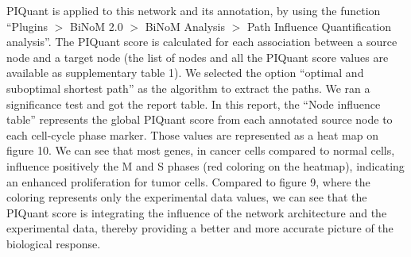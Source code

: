 \documentclass[10pt]{bmc_article}
\newenvironment{bmcformat}{\baselineskip20pt\sloppy\setboolean{publ}{false}}{\baselineskip20pt\sloppy}
\begin{document}
\begin{bmcformat}

PIQuant is applied to this network and its annotation, by using the function
``Plugins $>$ BiNoM 2.0 $>$ BiNoM Analysis $>$ Path Influence Quantification
analysis''. The PIQuant score is calculated for each association
between a source node and a target node (the list of nodes and all the PIQuant
score values are available as supplementary table 1). We selected the option ``optimal and
suboptimal shortest path'' as the algorithm to extract the paths. We ran a
significance test and got the report table. In this report, the ``Node influence
table'' represents the global PIQuant score from each annotated source node to
each cell-cycle phase marker. Those values are
represented as a heat map on figure 10. We can see that most
genes, in cancer cells compared to normal cells, influence positively the M and S phases (red
coloring on the heatmap), indicating an enhanced proliferation for tumor cells.
Compared to figure 9, where the coloring represents only the
experimental data values, we can see that the PIQuant score is integrating the
influence of the network architecture and the experimental data, thereby
providing a better and more accurate picture of the biological response.



\end{bmcformat}
\end{document}
